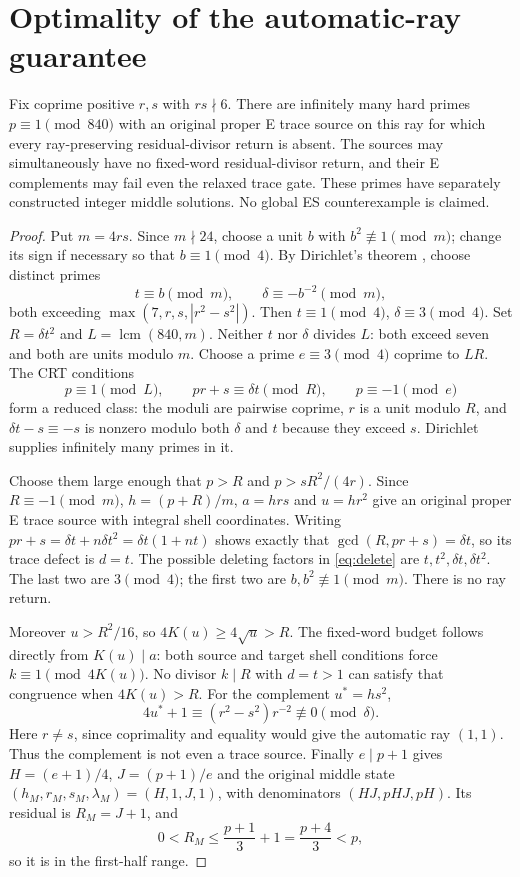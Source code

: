 \section{Optimality of the automatic-ray guarantee}\label{sec:optimal}
\begin{theorem}
Fix coprime positive $r,s$ with $rs\nmid6$. There are infinitely many hard
primes $p\equiv1\pmod{840}$ with an original proper E trace source on this ray
for which every ray-preserving residual-divisor return is absent. The sources
may simultaneously have no fixed-word residual-divisor return, and their E
complements may fail even the relaxed trace gate. These primes have separately
constructed integer middle solutions. No global ES counterexample is claimed.
\end{theorem}
\begin{proof}
Put $m=4rs$. Since $m\nmid24$, choose a unit $b$ with $b^2\not\equiv1\pmod m$;
change its sign if necessary so that $b\equiv1\pmod4$. By Dirichlet's theorem
\cite[Theorem 18.1]{Dirichlet}, choose distinct primes
\[
 t\equiv b\pmod m,\qquad \delta\equiv-b^{-2}\pmod m,
\]
both exceeding $\max(7,r,s,|r^2-s^2|)$. Then $t\equiv1\pmod4$,
$\delta\equiv3\pmod4$. Set $R=\delta t^2$ and $L=\operatorname{lcm}(840,m)$.
Neither \(t\) nor \(\delta\) divides \(L\): both exceed seven and both are
units modulo \(m\). Choose a prime $e\equiv3\pmod4$ coprime to $LR$. The CRT conditions
\begin{equation}\label{eq:CRT}
 p\equiv1\pmod L,\qquad pr+s\equiv\delta t\pmod R,
 \qquad p\equiv-1\pmod e
\end{equation}
form a reduced class: the moduli are pairwise coprime, $r$ is a unit modulo
$R$, and \(\delta t-s\equiv-s\) is nonzero modulo both $\delta$ and $t$
because they exceed \(s\). Dirichlet supplies
infinitely many primes in it.

Choose them large enough that $p>R$ and $p>sR^2/(4r)$. Since $R\equiv-1\pmod m$,
$h=(p+R)/m$, $a=hrs$ and $u=hr^2$ give an original proper E trace source
with integral shell coordinates. Writing
\(pr+s=\delta t+n\delta t^2=\delta t(1+nt)\) shows exactly that
\(\gcd(R,pr+s)=\delta t\), so its trace defect is $d=t$. The possible deleting
factors in \eqref{eq:delete} are $t,t^2,\delta t,\delta t^2$. The last two are
$3\pmod4$; the first two are $b,b^2\not\equiv1\pmod m$. There is no ray return.

Moreover $u>R^2/16$, so $4K(u)\ge4\sqrt u>R$. The fixed-word budget follows
directly from \(K(u)\mid a\): both source and target shell conditions force
\(k\equiv1\pmod{4K(u)}\). No divisor \(k\mid R\) with \(d=t>1\) can satisfy
that congruence when \(4K(u)>R\). For the complement $u^*=hs^2$,
\[
 4u^*+1\equiv (r^2-s^2)r^{-2}\not\equiv0\pmod\delta.
\]
Here $r\ne s$, since coprimality and equality would give the automatic ray
$(1,1)$. Thus the complement is not even a trace source.
Finally $e\mid p+1$ gives $H=(e+1)/4$, $J=(p+1)/e$ and the original middle
state $(h_M,r_M,s_M,\lambda_M)=(H,1,J,1)$, with denominators
$(HJ,pHJ,pH)$. Its residual is \(R_M=J+1\), and
\[
 0<R_M\le\frac{p+1}{3}+1=\frac{p+4}{3}<p,
\]
so it is in the first-half range.
\end{proof}


